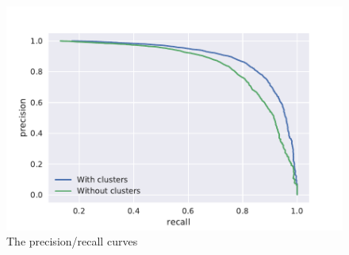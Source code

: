 \begin{figure}[htb]
  \centering
  \includegraphics[width=\textwidth]{figures/results/small_5_fold_pr.pdf}
  \caption{The precision/recall curves}
  \label{fig:small_pr}
\end{figure}

